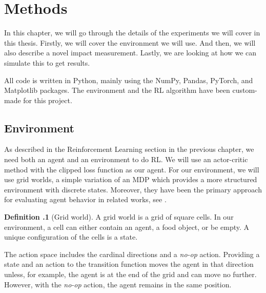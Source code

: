 \documentclass[12pt,A4]{report}
\theoremstyle{definition}
\begin{document}

\chapter{Methods}
In this chapter, we will go through the details of the experiments we will cover in this thesis. Firstly, we will cover the environment we will use. And then, we will also describe a novel impact measurement. Lastly, we are looking at how we can simulate this to get results.

All code is written in Python, mainly using the NumPy, Pandas, PyTorch, and Matplotlib packages. The environment and the RL algorithm have been custom-made for this project.

\section{Environment}
As described in the Reinforcement Learning section in the previous chapter, we need both an agent and an environment to do RL. We will use an actor-critic method with the clipped loss function as our agent. For our environment, we will use grid worlds, a simple variation of an MDP which provides a more structured environment with discrete states. Moreover, they have been the primary approach for evaluating agent behavior in related works, see \citet{Turner20, Krakovna19, Krakovna20}.


\begin{displayquote}
  \textbf{Definition \thesection.1} (Grid world).
  A grid world is a grid of square cells. In our environment, a cell can either contain an agent, a food object, or be empty. A unique configuration of the cells is a state. 
\end{displayquote}

The action space includes the cardinal directions and a \textit{no-op} action. Providing a state and an action to the transition function moves the agent in that direction unless, for example, the agent is at the end of the grid and can move no further. However, with the \textit{no-op} action, the agent remains in the same position.
\end{document}
